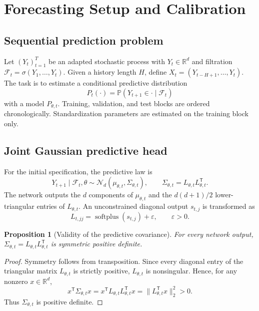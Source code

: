 \documentclass[11pt]{article}
\newtheorem{proposition}[definition]{Proposition}
\newcommand{\R}{\mathbb{R}}
\newcommand{\Pp}{\mathbb{P}}
\newcommand{\F}{\mathcal{F}}
\newcommand{\N}{\mathcal{N}}
\begin{document}
\section{Forecasting Setup and Calibration}

\subsection{Sequential prediction problem}

Let $(Y_t)_{t=1}^T$ be an adapted stochastic process with
$Y_t\in\R^d$ and filtration
$\F_t=\sigma(Y_1,\ldots,Y_t)$. Given a history length $H$, define
$X_t=(Y_{t-H+1},\ldots,Y_t)$. The task is to estimate a conditional predictive
distribution
\[
    P_t(\cdot)=\Pp(Y_{t+1}\in\cdot\mid\F_t)
\]
with a model $P_{\theta,t}$. Training, validation, and test blocks are ordered
chronologically. Standardization parameters are estimated on the training block
only.

\subsection{Joint Gaussian predictive head}

For the initial specification, the predictive law is
\begin{equation}
Y_{t+1}\mid\F_t,\theta
\sim \N_d\!\left(\mu_{\theta,t},\Sigma_{\theta,t}\right),
\qquad
\Sigma_{\theta,t}=L_{\theta,t}L_{\theta,t}^{\mathsf T}.
\label{eq:predictive}
\end{equation}
The network outputs the $d$ components of $\mu_{\theta,t}$ and the
$d(d+1)/2$ lower-triangular entries of $L_{\theta,t}$. An unconstrained diagonal
output $s_{t,j}$ is transformed as
\[
    L_{t,jj}=\operatorname{softplus}(s_{t,j})+\varepsilon,
    \qquad \varepsilon>0.
\]

\begin{proposition}[Validity of the predictive covariance]
For every network output, $\Sigma_{\theta,t}=L_{\theta,t}L_{\theta,t}^{\mathsf T}$
is symmetric positive definite.
\end{proposition}

\begin{proof}
Symmetry follows from transposition. Since every diagonal entry of the triangular
matrix $L_{\theta,t}$ is strictly positive, $L_{\theta,t}$ is nonsingular. Hence,
for any nonzero $x\in\R^d$,
\[
x^{\mathsf T}\Sigma_{\theta,t}x
=x^{\mathsf T}L_{\theta,t}L_{\theta,t}^{\mathsf T}x
=\|L_{\theta,t}^{\mathsf T}x\|_2^2>0.
\]
Thus $\Sigma_{\theta,t}$ is positive definite.
\end{proof}
\end{document}
